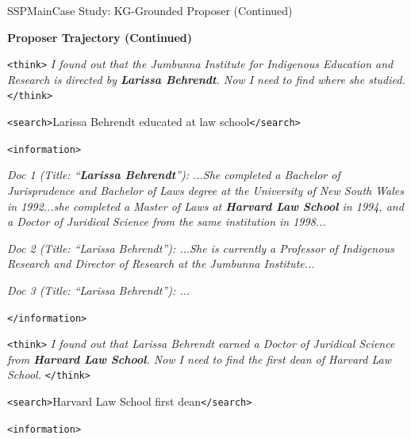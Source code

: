 \begin{casepagebox}{SSPMain}{Case Study: KG-Grounded Proposer (Continued)}
\noindent\colorbox{SSPMain!20}{\parbox{\dimexpr\linewidth-2\fboxsep}{\textcolor{SSPMain}{\textbf{Proposer Trajectory (Continued)}}}}

\vspace{3mm}

\begin{thinkpanel}
\textcolor{TagThink}{\texttt{<think>}} \textit{I found out that the Jumbunna Institute for Indigenous Education and Research is directed by \colorbox{yellow!30}{\textbf{Larissa Behrendt}}. Now I need to find where she studied.} \textcolor{TagThink}{\texttt{</think>}}
\end{thinkpanel}

\textcolor{TagSearch}{\texttt{<search>}}Larissa Behrendt educated at law school\textcolor{TagSearch}{\texttt{</search>}}

\textcolor{TagInfo}{\texttt{<information>}}

\textit{Doc 1 (Title: ``\colorbox{yellow!30}{\textbf{Larissa Behrendt}}''): ...She completed a Bachelor of Jurisprudence and Bachelor of Laws degree at the University of New South Wales in 1992...she completed a Master of Laws at \colorbox{yellow!30}{\textbf{Harvard Law School}} in 1994, and a Doctor of Juridical Science from the same institution in 1998...}

\textit{Doc 2 (Title: ``Larissa Behrendt''): ...She is currently a Professor of Indigenous Research and Director of Research at the Jumbunna Institute...}

\textit{Doc 3 (Title: ``Larissa Behrendt''): ...}

\textcolor{TagInfo}{\texttt{</information>}}
\vspace{3mm}

\begin{thinkpanel}
\textcolor{TagThink}{\texttt{<think>}} \textit{I found out that Larissa Behrendt earned a Doctor of Juridical Science from \colorbox{yellow!30}{\textbf{Harvard Law School}}. Now I need to find the first dean of Harvard Law School.} \textcolor{TagThink}{\texttt{</think>}}
\end{thinkpanel}

\textcolor{TagSearch}{\texttt{<search>}}Harvard Law School first dean\textcolor{TagSearch}{\texttt{</search>}}

\textcolor{TagInfo}{\texttt{<information>}}


\end{casepagebox}
